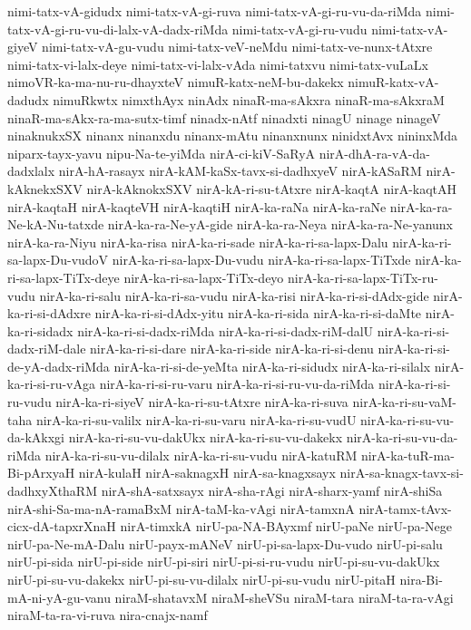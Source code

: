{nimi-tatx-vA-gidudx
nimi-tatx-vA-gi-ruva
nimi-tatx-vA-gi-ru-vu-da-riMda
nimi-tatx-vA-gi-ru-vu-di-lalx-vA-dadx-riMda
nimi-tatx-vA-gi-ru-vudu
nimi-tatx-vA-giyeV
nimi-tatx-vA-gu-vudu
nimi-tatx-veV-neMdu
nimi-tatx-ve-nunx-tAtxre
nimi-tatx-vi-lalx-deye
nimi-tatx-vi-lalx-vAda
nimi-tatxvu
nimi-tatx-vuLaLx
nimoVR-ka-ma-nu-ru-dhayxteV
nimuR-katx-neM-bu-dakekx
nimuR-katx-vA-dadudx
nimuRkwtx
nimxthAyx
ninAdx
ninaR-ma-sAkxra
ninaR-ma-sAkxraM
ninaR-ma-sAkx-ra-ma-sutx-timf
ninadx-nAtf
ninadxti
ninagU
ninage
ninageV
ninaknukxSX
ninanx
ninanxdu
ninanx-mAtu
ninanxnunx
ninidxtAvx
nininxMda
niparx-tayx-yavu
nipu-Na-te-yiMda
nirA-ci-kiV-SaRyA
nirA-dhA-ra-vA-da-dadxlalx
nirA-hA-rasayx
nirA-kAM-kaSx-tavx-si-dadhxyeV
nirA-kASaRM
nirA-kAknekxSXV
nirA-kAknokxSXV
nirA-kA-ri-su-tAtxre
nirA-kaqtA
nirA-kaqtAH
nirA-kaqtaH
nirA-kaqteVH
nirA-kaqtiH
nirA-ka-raNa
nirA-ka-raNe
nirA-ka-ra-Ne-kA-Nu-tatxde
nirA-ka-ra-Ne-yA-gide
nirA-ka-ra-Neya
nirA-ka-ra-Ne-yanunx
nirA-ka-ra-Niyu
nirA-ka-risa
nirA-ka-ri-sade
nirA-ka-ri-sa-lapx-Dalu
nirA-ka-ri-sa-lapx-Du-vudoV
nirA-ka-ri-sa-lapx-Du-vudu
nirA-ka-ri-sa-lapx-TiTxde
nirA-ka-ri-sa-lapx-TiTx-deye
nirA-ka-ri-sa-lapx-TiTx-deyo
nirA-ka-ri-sa-lapx-TiTx-ru-vudu
nirA-ka-ri-salu
nirA-ka-ri-sa-vudu
nirA-ka-risi
nirA-ka-ri-si-dAdx-gide
nirA-ka-ri-si-dAdxre
nirA-ka-ri-si-dAdx-yitu
nirA-ka-ri-sida
nirA-ka-ri-si-daMte
nirA-ka-ri-sidadx
nirA-ka-ri-si-dadx-riMda
nirA-ka-ri-si-dadx-riM-dalU
nirA-ka-ri-si-dadx-riM-dale
nirA-ka-ri-si-dare
nirA-ka-ri-side
nirA-ka-ri-si-denu
nirA-ka-ri-si-de-yA-dadx-riMda
nirA-ka-ri-si-de-yeMta
nirA-ka-ri-sidudx
nirA-ka-ri-silalx
nirA-ka-ri-si-ru-vAga
nirA-ka-ri-si-ru-varu
nirA-ka-ri-si-ru-vu-da-riMda
nirA-ka-ri-si-ru-vudu
nirA-ka-ri-siyeV
nirA-ka-ri-su-tAtxre
nirA-ka-ri-suva
nirA-ka-ri-su-vaM-taha
nirA-ka-ri-su-valilx
nirA-ka-ri-su-varu
nirA-ka-ri-su-vudU
nirA-ka-ri-su-vu-da-kAkxgi
nirA-ka-ri-su-vu-dakUkx
nirA-ka-ri-su-vu-dakekx
nirA-ka-ri-su-vu-da-riMda
nirA-ka-ri-su-vu-dilalx
nirA-ka-ri-su-vudu
nirA-katuRM
nirA-ka-tuR-ma-Bi-pArxyaH
nirA-kulaH
nirA-saknagxH
nirA-sa-knagxsayx
nirA-sa-knagx-tavx-si-dadhxyXthaRM
nirA-shA-satxsayx
nirA-sha-rAgi
nirA-sharx-yamf
nirA-shiSa
nirA-shi-Sa-ma-nA-ramaBxM
nirA-taM-ka-vAgi
nirA-tamxnA
nirA-tamx-tAvx-cicx-dA-tapxrXnaH
nirA-timxkA
nirU-pa-NA-BAyxmf
nirU-paNe
nirU-pa-Nege
nirU-pa-Ne-mA-Dalu
nirU-payx-mANeV
nirU-pi-sa-lapx-Du-vudo
nirU-pi-salu
nirU-pi-sida
nirU-pi-side
nirU-pi-siri
nirU-pi-si-ru-vudu
nirU-pi-su-vu-dakUkx
nirU-pi-su-vu-dakekx
nirU-pi-su-vu-dilalx
nirU-pi-su-vudu
nirU-pitaH
nira-Bi-mA-ni-yA-gu-vanu
niraM-shatavxM
niraM-sheVSu
niraM-tara
niraM-ta-ra-vAgi
niraM-ta-ra-vi-ruva
nira-cnajx-namf
}
